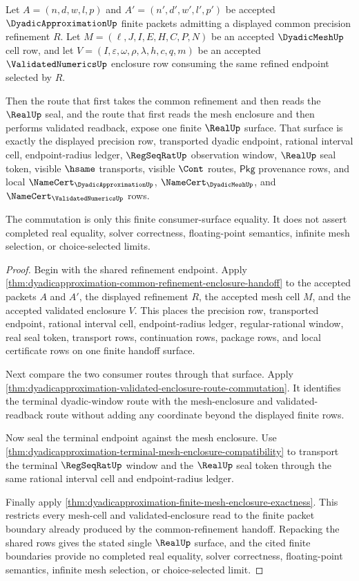 \begin{theorem}
\label{thm:dyadicapproximation-refinement-seal-commutation}
Let $A=(n,d,w,l,p)$ and $A'=(n',d',w',l',p')$ be accepted
$\DyadicApproximationUp$ finite packets admitting a displayed common
precision refinement $R$. Let $M=(\ell,J,I,E,H,C,P,N)$ be an accepted
$\DyadicMeshUp$ cell row, and let
$V=(I,\varepsilon,\omega,\rho,\lambda,h,c,q,m)$ be an accepted
$\ValidatedNumericsUp$ enclosure row consuming the same refined endpoint
selected by $R$.

Then the route that first takes the common refinement and then reads the
$\RealUp$ seal, and the route that first reads the mesh enclosure and then
performs validated readback, expose one finite $\RealUp$ surface. That
surface is exactly the displayed precision row, transported dyadic endpoint,
rational interval cell, endpoint-radius ledger, $\RegSeqRatUp$ observation
window, $\RealUp$ seal token, visible $\hsame$ transports, visible $\Cont$
routes, $\mathsf{Pkg}$ provenance rows, and local
$\NameCert_{\DyadicApproximationUp}$, $\NameCert_{\DyadicMeshUp}$, and
$\NameCert_{\ValidatedNumericsUp}$ rows.

The commutation is only this finite consumer-surface equality. It does not
assert completed real equality, solver correctness, floating-point semantics,
infinite mesh selection, or choice-selected limits.
\end{theorem}
\begin{proof}
Begin with the shared refinement endpoint. Apply
\autoref{thm:dyadicapproximation-common-refinement-enclosure-handoff} to the
accepted packets $A$ and $A'$, the displayed refinement $R$, the accepted mesh
cell $M$, and the accepted validated enclosure $V$. This places the precision
row, transported endpoint, rational interval cell, endpoint-radius ledger,
regular-rational window, real seal token, transport rows, continuation rows,
package rows, and local certificate rows on one finite handoff surface.

Next compare the two consumer routes through that surface. Apply
\autoref{thm:dyadicapproximation-validated-enclosure-route-commutation}. It
identifies the terminal dyadic-window route with the mesh-enclosure and
validated-readback route without adding any coordinate beyond the displayed
finite rows.

Now seal the terminal endpoint against the mesh enclosure. Use
\autoref{thm:dyadicapproximation-terminal-mesh-enclosure-compatibility} to
transport the terminal $\RegSeqRatUp$ window and the $\RealUp$ seal token
through the same rational interval cell and endpoint-radius ledger.

Finally apply
\autoref{thm:dyadicapproximation-finite-mesh-enclosure-exactness}. This
restricts every mesh-cell and validated-enclosure read to the finite packet
boundary already produced by the common-refinement handoff. Repacking the
shared rows gives the stated single $\RealUp$ surface, and the cited finite
boundaries provide no completed real equality, solver correctness,
floating-point semantics, infinite mesh selection, or choice-selected limit.
\end{proof}
